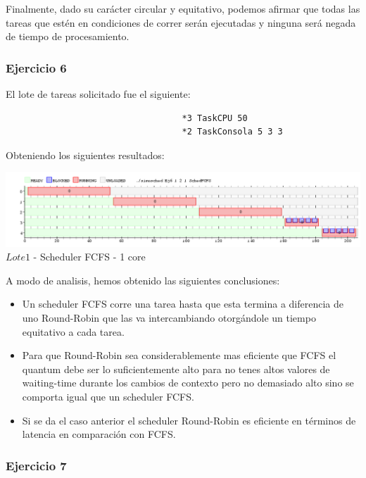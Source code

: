\indent Finalmente, dado su carácter circular y equitativo, podemos afirmar que todas las tareas que 
estén en condiciones de correr serán ejecutadas y ninguna será negada de tiempo de procesamiento.\\


\subsubsection[Resolución Ejercicio 6]{Ejercicio 6}

El lote de tareas solicitado fue el siguiente:
\begin{verbatim}
                                   *3 TaskCPU 50
                                   *2 TaskConsola 5 3 3
\end{verbatim}

Obteniendo los siguientes resultados:

\begin{center}
  	\includegraphics[width=450pt]{./Test/ej6.png}
	  {$Lote 1$ - Scheduler FCFS - 1 core}	
\end{center}

\indent A modo de analisis, hemos obtenido las siguientes conclusiones:\\


\begin{itemize}
 \item Un scheduler FCFS corre una tarea hasta que esta termina a diferencia de uno Round-Robin 
que las va intercambiando otorg\'{a}ndole un tiempo equitativo a cada tarea.
\item Para que Round-Robin sea considerablemente mas eficiente que FCFS el quantum debe ser 
lo suficientemente alto para no tenes altos valores de waiting-time durante los cambios de 
contexto pero no demasiado alto sino se comporta igual que un scheduler FCFS.
\item Si se da el caso anterior el scheduler Round-Robin es eficiente en t\'{e}rminos 
de latencia en comparaci\'{o}n con FCFS.
\end{itemize}


\subsubsection[Resolución Ejercicio 7]{Ejercicio 7}


